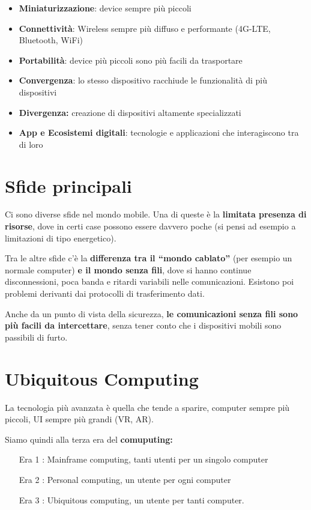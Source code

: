 \begin{itemize}
\item \textbf{Miniaturizzazione}: device sempre più piccoli
\item \textbf{Connettività}: Wireless sempre più diffuso e performante
  (4G-LTE, Bluetooth, WiFi)
\item \textbf{Portabilità}: device più piccoli sono più facili da
  trasportare
\item \textbf{Convergenza}: lo stesso dispositivo racchiude le funzionalità
  di più dispositivi
\item \textbf{Divergenza:} creazione di dispositivi altamente specializzati
\item \textbf{App e Ecosistemi digitali}: tecnologie e applicazioni che
  interagiscono tra di loro

\end{itemize}

\section{Sfide principali}

Ci sono diverse sfide nel mondo mobile. Una di  queste è la \textbf{limitata
presenza di risorse}, dove in certi case possono essere davvero poche (si pensi
ad esempio a limitazioni di tipo energetico).

Tra le altre sfide c'è la \textbf{differenza tra il ``mondo cablato''} (per
esempio un normale computer) \textbf{e il mondo senza fili}, dove si hanno
continue disconnessioni, poca banda e ritardi variabili nelle comunicazioni.
Esistono poi problemi derivanti dai protocolli di trasferimento dati.

Anche da un punto di vista della sicurezza, \textbf{le comunicazioni senza fili
sono più facili da intercettare}, senza tener conto che i dispositivi mobili
sono passibili di furto.

\section{Ubiquitous Computing }
\label{ubiquitous-computing}

La tecnologia più avanzata è quella che tende a sparire, computer sempre
più piccoli, UI sempre più grandi (VR, AR).

Siamo quindi alla terza era del \textbf{comuputing:}

\begin{itemize}
\item[Era 1]: Mainframe computing, tanti utenti per un singolo computer
\item[Era 2]: Personal computing, un utente per ogni computer
\item[Era 3]: Ubiquitous computing, un utente per tanti computer.

\end{itemize}

